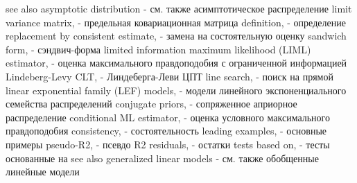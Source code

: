 see also asymptotic distribution - см. также асимптотическое распределение
limit variance matrix, - предельная ковариационная матрица
definition, - определение
replacement by consistent estimate, - замена на состоятельную оценку
sandwich form, - сэндвич-форма
limited information maximum likelihood (LIML) estimator, - оценка максимального правдоподобия с ограниченной информацией
Lindeberg-Levy CLT, - Линдеберга-Леви ЦПТ
line search, - поиск на прямой
linear exponential family (LEF) models, - модели линейного экспоненциального семейства распределений
conjugate priors, - сопряженное априорное распределение
conditional ML estimator, - оценка условного максимального правдоподобия
consistency, - состоятельность
leading examples, - основные примеры
pseudo-R2, - псевдо R2
residuals, - остатки
tests based on, - тесты основанные на
see also generalized linear models - см. также обобщенные линейные модели

